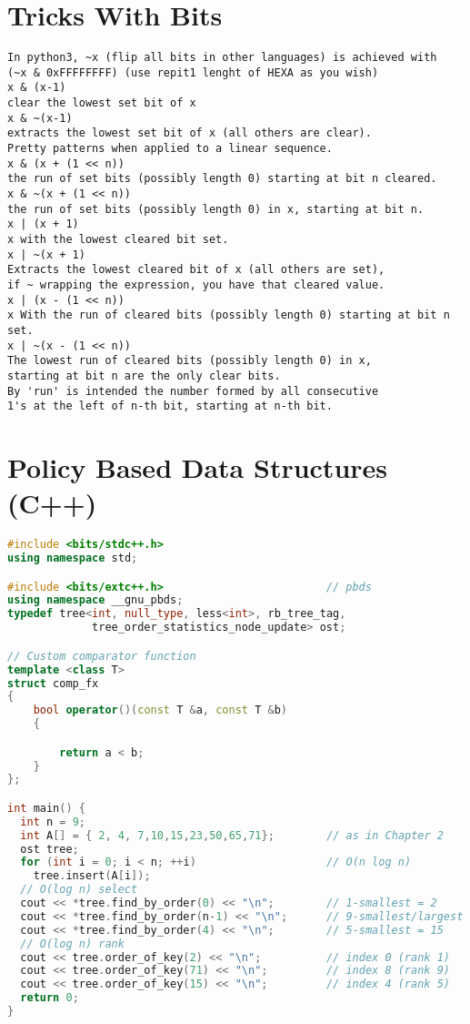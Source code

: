 \section{Tricks With Bits}
\begin{verbatim}
In python3, ~x (flip all bits in other languages) is achieved with
(~x & 0xFFFFFFFF) (use repit1 lenght of HEXA as you wish)
x & (x-1)
clear the lowest set bit of x
x & ~(x-1)
extracts the lowest set bit of x (all others are clear).
Pretty patterns when applied to a linear sequence.
x & (x + (1 << n))
the run of set bits (possibly length 0) starting at bit n cleared.
x & ~(x + (1 << n))
the run of set bits (possibly length 0) in x, starting at bit n.
x | (x + 1)
x with the lowest cleared bit set.
x | ~(x + 1)
Extracts the lowest cleared bit of x (all others are set),
if ~ wrapping the expression, you have that cleared value.
x | (x - (1 << n))
x With the run of cleared bits (possibly length 0) starting at bit n set.
x | ~(x - (1 << n))
The lowest run of cleared bits (possibly length 0) in x,
starting at bit n are the only clear bits.
By 'run' is intended the number formed by all consecutive
1's at the left of n-th bit, starting at n-th bit.
\end{verbatim}

\section{Policy Based Data Structures (C++)}

\begin{lstlisting}[language=C++]
#include <bits/stdc++.h>
using namespace std;

#include <bits/extc++.h>                         // pbds
using namespace __gnu_pbds;
typedef tree<int, null_type, less<int>, rb_tree_tag,
             tree_order_statistics_node_update> ost;

// Custom comparator function
template <class T>
struct comp_fx
{
    bool operator()(const T &a, const T &b)
    {

        return a < b;
    }
};

int main() {
  int n = 9;
  int A[] = { 2, 4, 7,10,15,23,50,65,71};        // as in Chapter 2
  ost tree;
  for (int i = 0; i < n; ++i)                    // O(n log n)
    tree.insert(A[i]);
  // O(log n) select
  cout << *tree.find_by_order(0) << "\n";        // 1-smallest = 2
  cout << *tree.find_by_order(n-1) << "\n";      // 9-smallest/largest = 71
  cout << *tree.find_by_order(4) << "\n";        // 5-smallest = 15
  // O(log n) rank
  cout << tree.order_of_key(2) << "\n";          // index 0 (rank 1)
  cout << tree.order_of_key(71) << "\n";         // index 8 (rank 9)
  cout << tree.order_of_key(15) << "\n";         // index 4 (rank 5)
  return 0;
}
\end{lstlisting}

